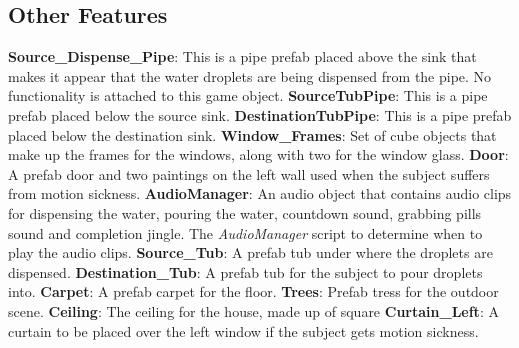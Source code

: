 \documentclass{article}
\begin{document}
\subsection{Other Features} %
\textbf{Source\_Dispense\_Pipe}: This is a pipe prefab placed above the sink that makes it appear that the water droplets are being dispensed from the pipe. No functionality is attached to this game object.\newline \newline
\textbf{SourceTubPipe}: This is a pipe prefab placed below the source sink.\newline \newline
\textbf{DestinationTubPipe}: This is a pipe prefab placed below the destination sink.\newline \newline
\textbf{Window\_Frames}: Set of cube objects that make up the frames for the windows, along with two for the window glass.\newline \newline
\textbf{Door}: A prefab door and two paintings on the left wall used when the subject suffers from motion sickness.\newline \newline
\textbf{AudioManager}: An audio object that contains audio clips for dispensing the water, pouring the water, countdown sound, grabbing pills sound and completion jingle. The \textit{AudioManager} script to determine when to play the audio clips.\newline \newline
\textbf{Source\_Tub}: A prefab tub under where the droplets are dispensed.\newline \newline
\textbf{Destination\_Tub}: A prefab tub for the subject to pour droplets into.\newline \newline
\textbf{Carpet}: A prefab carpet for the floor.\newline \newline
\textbf{Trees}: Prefab tress for the outdoor scene. \newline \newline
\textbf{Ceiling}: The ceiling for the house, made up of square
\textbf{Curtain\_Left}: A curtain to be placed over the left window if the subject gets motion sickness. \newline \newline
\end{document}

